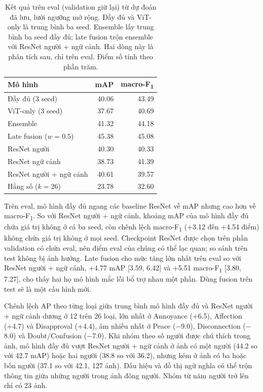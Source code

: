 \documentclass[conference]{IEEEtran}
\newcommand{\mf}{macro-F\textsubscript{1}}
\newcommand{\tablegap}{\setlength{\tabcolsep}{4pt}}
\begin{document}
\begin{table}[t]
\centering
\caption{Kết quả trên eval (validation giữ lại) từ dự đoán đã lưu, lưới ngưỡng mở rộng. Đầy đủ và ViT-only là trung bình ba seed. Ensemble lấy trung bình ba seed đầy đủ; late fusion trộn ensemble với ResNet người + ngữ cảnh. Hai dòng này là phân tích sau, chỉ trên eval. Điểm số tính theo phần trăm.}
\label{tab:eval}
\small
\tablegap
\begin{tabular}{lrr}
\toprule
Mô hình & mAP & \mf{} \\
\midrule
Đầy đủ (3 seed) & 40.06 & 43.49 \\
ViT-only (3 seed) & 37.67 & 40.69 \\
Ensemble & 41.32 & 44.18 \\
Late fusion ($w=0.5$) & 45.38 & 45.08 \\
\midrule
ResNet người & 40.30 & 40.33 \\
ResNet ngữ cảnh & 38.73 & 41.39 \\
ResNet người + ngữ cảnh & 40.61 & 39.57 \\
Hằng số ($k=26$) & 23.78 & 32.60 \\
\bottomrule
\end{tabular}
\end{table}

Trên eval, mô hình đầy đủ ngang các baseline ResNet về mAP nhưng cao hơn về \mf{}. So với ResNet người + ngữ cảnh, khoảng mAP của mô hình đầy đủ chứa giá trị không ở cả ba seed, còn chênh lệch \mf{} (+3.12 đến +4.54 điểm) không chứa giá trị không ở mọi seed. Checkpoint ResNet được chọn trên phần validation có chứa eval, nên điểm eval của chúng có thể lạc quan; so sánh trên test không bị ảnh hưởng. Late fusion cho mức tăng lớn nhất trên eval so với ResNet người + ngữ cảnh, +4.77 mAP [3.59, 6.42] và +5.51 \mf{} [3.80, 7.27], cho thấy hai họ mô hình mắc lỗi bổ trợ nhau một phần. Dùng fusion trên test sẽ là một cấu hình mới.

Chênh lệch AP theo từng loại giữa trung bình mô hình đầy đủ và ResNet người + ngữ cảnh dương ở 12 trên 26 loại, lớn nhất ở Annoyance (+6.5), Affection (+4.7) và Disapproval (+4.4), âm nhiều nhất ở Peace ($-$9.0), Disconnection ($-$8.0) và Doubt/Confusion ($-$7.0). Khi nhóm theo số người được chú thích trong ảnh, mô hình đầy đủ vượt ResNet người + ngữ cảnh ở ảnh có một người (44.2 so với 42.7 mAP) hoặc hai người (38.8 so với 36.2), nhưng kém ở ảnh có ba hoặc bốn người (37.1 so với 42.1, 127 ảnh). Dấu hiệu và đồ thị ngữ nghĩa có thể trộn thông tin giữa những người trong ảnh đông người. Nhóm từ năm người trở lên chỉ có 23 ảnh.
\end{document}
